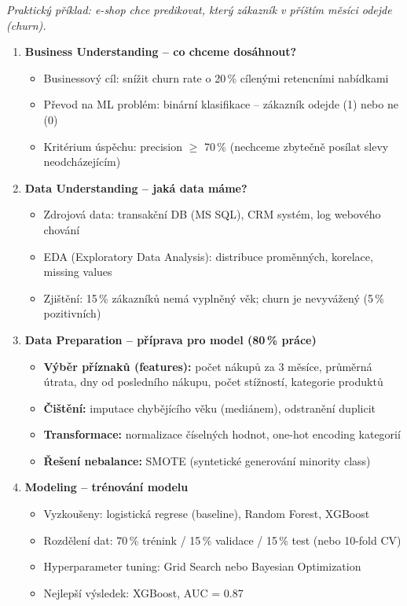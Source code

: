 \textit{Praktický příklad: e-shop chce predikovat, který zákazník v příštím měsíci odejde (churn).}

\begin{enumerate}
  \item \textbf{Business Understanding -- co chceme dosáhnout?}
    \begin{itemize}
      \item Businessový cíl: snížit churn rate o 20\,\% cílenými retencními nabídkami
      \item Převod na ML problém: binární klasifikace -- zákazník odejde (1) nebo ne (0)
      \item Kritérium úspěchu: precision $\geq$ 70\,\% (nechceme zbytečně posílat slevy neodcházejícím)
    \end{itemize}

  \item \textbf{Data Understanding -- jaká data máme?}
    \begin{itemize}
      \item Zdrojová data: transakční DB (MS SQL), CRM systém, log webového chování
      \item EDA (Exploratory Data Analysis): distribuce proměnných, korelace, missing values
      \item Zjištění: 15\,\% zákazníků nemá vyplněný věk; churn je nevyvážený (5\,\% pozitivních)
    \end{itemize}

  \item \textbf{Data Preparation -- příprava pro model (80\,\% práce)}
    \begin{itemize}
      \item \textbf{Výběr příznaků (features):} počet nákupů za 3 měsíce, průměrná útrata,
        dny od posledního nákupu, počet stížností, kategorie produktů
      \item \textbf{Čištění:} imputace chybějícího věku (mediánem), odstranění duplicit
      \item \textbf{Transformace:} normalizace číselných hodnot, one-hot encoding kategorií
      \item \textbf{Řešení nebalance:} SMOTE (syntetické generování minority class)
    \end{itemize}

  \item \textbf{Modeling -- trénování modelu}
    \begin{itemize}
      \item Vyzkoušeny: logistická regrese (baseline), Random Forest, XGBoost
      \item Rozdělení dat: 70\,\% trénink / 15\,\% validace / 15\,\% test (nebo 10-fold CV)
      \item Hyperparameter tuning: Grid Search nebo Bayesian Optimization
      \item Nejlepší výsledek: XGBoost, AUC = 0.87
    \end{itemize}


\end{enumerate}
